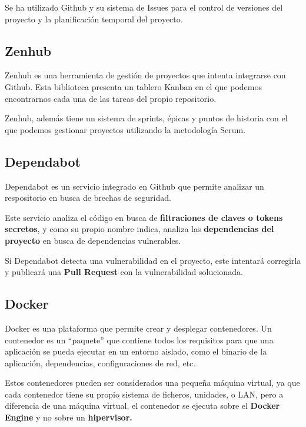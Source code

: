 Se ha utilizado Github y su sistema de Issues para el control de
versiones del proyecto y la planificación temporal del proyecto.

\hypertarget{zenhub}{%
\subsection{Zenhub}\label{zenhub}}

Zenhub es una herramienta de gestión de proyectos que intenta integrarse
con Github. Esta biblioteca presenta un tablero Kanban en el que podemos
encontrarnos cada una de las tareas del propio repositorio.

Zenhub, además tiene un sistema de sprints, épicas y puntos de historia
con el que podemos gestionar proyectos utilizando la metodología Scrum.

\hypertarget{dependabot}{%
\subsection{\texorpdfstring{Dependabot
}{Dependabot }}\label{dependabot}}

Dependabot es un servicio integrado en Github que permite analizar un
respositorio en busca de brechas de seguridad.

Este servicio analiza el código en busca de \textbf{filtraciones de
claves o tokens secretos}, y como su propio nombre indica, analiza las
\textbf{dependencias del proyecto} en busca de dependencias vulnerables.

Si Dependabot detecta una vulnerabilidad en el proyecto, este intentará
corregirla y publicará una \textbf{Pull Request} con la vulnerabilidad
solucionada.

\hypertarget{docker}{%
\subsection{Docker}\label{docker}}

Docker es una plataforma que permite crear y desplegar contenedores. Un
contenedor es un ``paquete'' que contiene todos los requisitos para que
una aplicación se pueda ejecutar en un entorno aislado, como el binario
de la aplicación, dependencias, configuraciones de red, etc.

Estos contenedores pueden ser considerados una pequeña máquina virtual,
ya que cada contenedor tiene su propio sistema de ficheros, unidades, o
LAN, pero a diferencia de una máquina virtual, el contenedor se ejecuta
sobre el \textbf{Docker Engine} y no sobre un \textbf{hipervisor.}

